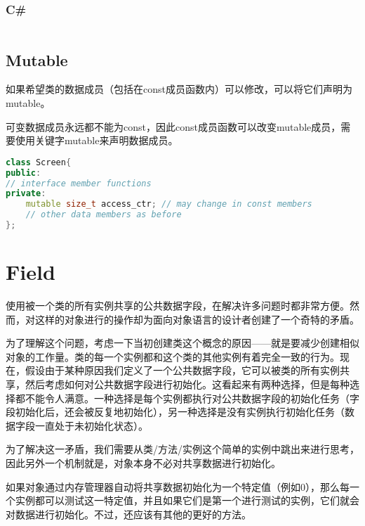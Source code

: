\subsection{C\#}



\begin{lstlisting}[language=C++]

\end{lstlisting}

\section{Mutable}

如果希望类的数据成员（包括在const成员函数内）可以修改，可以将它们声明为mutable。

可变数据成员永远都不能为const，因此const成员函数可以改变mutable成员，需要使用关键字mutable来声明数据成员。

\begin{lstlisting}[language=C++]
class Screen{
public:
// interface member functions
private:
	mutable size_t access_ctr; // may change in const members
	// other data members as before
};
\end{lstlisting}







\chapter{Field}

使用被一个类的所有实例共享的公共数据字段，在解决许多问题时都非常方便。然而，对这样的对象进行的操作却为面向对象语言的设计者创建了一个奇特的矛盾。

为了理解这个问题，考虑一下当初创建类这个概念的原因——就是要减少创建相似对象的工作量。类的每一个实例都和这个类的其他实例有着完全一致的行为。现在，假设由于某种原因我们定义了一个公共数据字段，它可以被类的所有实例共享，然后考虑如何对公共数据字段进行初始化。这看起来有两种选择，但是每种选择都不能令人满意。一种选择是每个实例都执行对公共数据字段的初始化任务（字段初始化后，还会被反复地初始化），另一种选择是没有实例执行初始化任务（数据字段一直处于未初始化状态）。

为了解决这一矛盾，我们需要从类/方法/实例这个简单的实例中跳出来进行思考，因此另外一个机制就是，对象本身不必对共享数据进行初始化。

如果对象通过内存管理器自动将共享数据初始化为一个特定值（例如0），那么每一个实例都可以测试这一特定值，并且如果它们是第一个进行测试的实例，它们就会对数据进行初始化。不过，还应该有其他的更好的方法。

